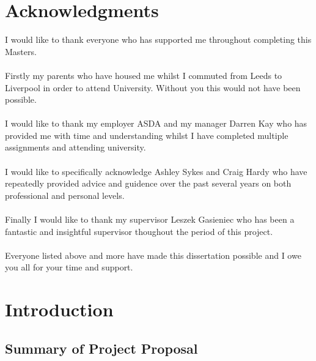 \documentclass[a4paper,11pt]{report}
\begin{document}
\chapter*{Acknowledgments}
I would like to thank everyone who has supported me throughout completing this Masters.
\\
\\ 
Firstly my parents who have housed me whilst I commuted from Leeds to Liverpool in order to attend University. Without you this would not have been possible. 
\\
\\
I would like to thank my employer ASDA and my manager Darren Kay who has provided me with time and understanding whilst I have completed multiple assignments and attending university.
\\
\\
I would like to specifically acknowledge Ashley Sykes and Craig Hardy who have repeatedly provided advice and guidence over the past several years on both professional and personal levels. 
\\
\\
Finally I would like to thank my supervisor Leszek Gasieniec who has been a fantastic and insightful supervisor thoughout the period of this project. 
\\
\\
Everyone listed above and more have made this dissertation possible and I owe you all for your time and support.



\newpage



\tableofcontents





\chapter{Introduction}\label{chap:intro}

\section{Summary of Project Proposal}
\end{document}
